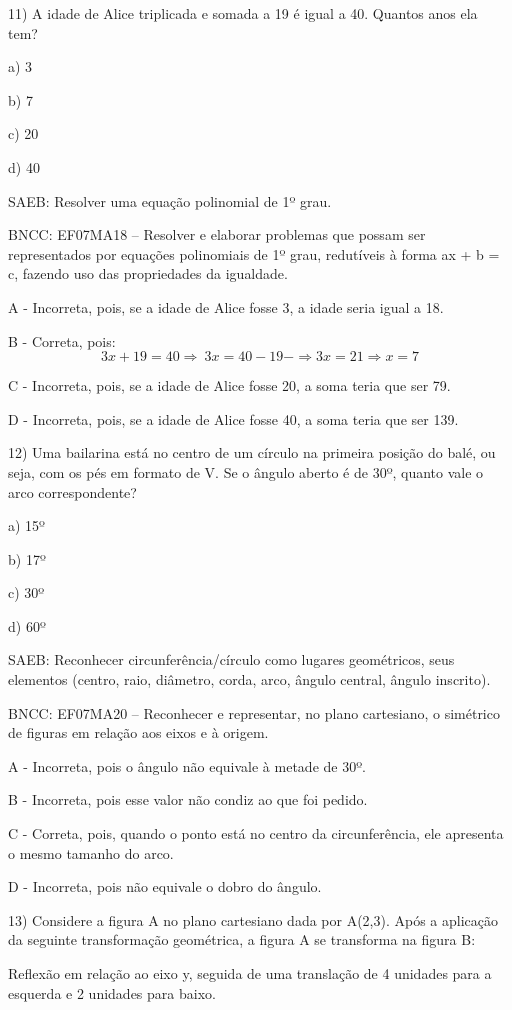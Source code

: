 11) A idade de Alice triplicada e somada a 19 é igual a 40. Quantos anos
ela tem?

a) 3

b) 7

c) 20

d) 40

SAEB: Resolver uma equação polinomial de 1º grau.

BNCC: EF07MA18 -- Resolver e elaborar problemas que possam ser
representados por equações polinomiais de 1º grau, redutíveis à forma ax
+ b = c, fazendo uso das propriedades da igualdade.

A - Incorreta, pois, se a idade de Alice fosse 3, a idade seria igual a
18.

B - Correta, pois:
\[3x + 19 = 40 \Rightarrow \ 3x = 40 - 19 - \Rightarrow 3x = 21 \Rightarrow x = 7\]

C - Incorreta, pois, se a idade de Alice fosse 20, a soma teria que ser
79.

D - Incorreta, pois, se a idade de Alice fosse 40, a soma teria que ser
139.

12) Uma bailarina está no centro de um círculo na primeira posição do
balé, ou seja, com os pés em formato de V. Se o ângulo aberto é de 30º,
quanto vale o arco correspondente?

a) 15º

b) 17º

c) 30º

d) 60º

SAEB: Reconhecer circunferência/círculo como lugares geométricos, seus
elementos (centro, raio, diâmetro, corda, arco, ângulo central, ângulo
inscrito).

BNCC: EF07MA20 -- Reconhecer e representar, no plano cartesiano, o
simétrico de figuras em relação aos eixos e à origem.

A - Incorreta, pois o ângulo não equivale à metade de 30º.

B - Incorreta, pois esse valor não condiz ao que foi pedido.

C - Correta, pois, quando o ponto está no centro da circunferência, ele
apresenta o mesmo tamanho do arco.

D - Incorreta, pois não equivale o dobro do ângulo.

13) Considere a figura A no plano cartesiano dada por A(2,3). Após a
aplicação da seguinte transformação geométrica, a figura A se transforma
na figura B:

Reflexão em relação ao eixo y, seguida de uma translação de 4 unidades
para a esquerda e 2 unidades para baixo.

